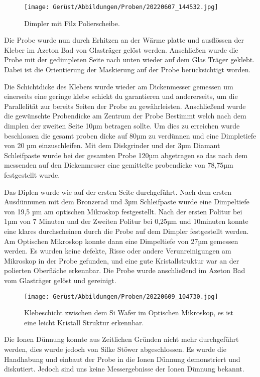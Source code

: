 \begin{figure}[htbp]
 \centering
 \texttt{[image: Gerüst/Abbildungen/Proben/20220607\_144532.jpg]}
 \caption[Dimpler]{Dimpler mit Filz Polierscheibe.}
 \label{Dimpler}
\end{figure}

Die Probe wurde nun durch Erhitzen an der Wärme platte und ausflössen der Kleber im Azeton Bad von Glasträger gelöst werden. Anschließen wurde die Probe mit der gedimpleten Seite nach unten wieder auf dem Glas Träger geklebt. Dabei ist die Orientierung der Maskierung auf der Probe berücksichtigt worden.

Die Schichtdicke des Klebers wurde wieder am Dickenmesser gemessen um einerseits eine geringe klebe schickt du garantieren und andererseits, um die Parallelität zur bereits Seiten der Probe zu gewährleisten.
Anschließend wurde die gewünschte Probendicke am Zentrum der Probe Bestimmt welch nach dem dimplen der zweiten Seite 10µm betragen sollte. Um dies zu erreichen wurde beschlossen die gesamt proben dicke auf 80µm zu verdünnen und eine Dimpletiefe von 20 µm einzuschleifen.
Mit dem Diskgrinder und der 3µm Diamant Schleifpaste wurde bei der gesamten Probe 120µm abgetragen so das nach dem messenden auf den Dickenmesser eine gemittelte probendicke von 78,75µm festgestellt wurde. 

Das Diplen wurde wie auf der ersten Seite durchgeführt. Nach dem ersten Ausdünnunen mit dem Bronzerad und 3µm Schleifpaste wurde eine Dimpeltiefe von 19,5 µm am optischen Mikroskop festgestellt. Nach der ersten Politur bei 1µm von 7 Minuten und der Zweiten Politur bei 0,25µm und 10minuten konnte eine klares durchscheinen durch die Probe auf dem Dimpler festgestellt werden.
Am Optischen Mikroskop konnte dann eine Dimpeltiefe von 27µm gemessen werden. Es wurden keine defekte, Risse oder andere Verunreinigungen am Mikroskop in der Probe gefunden, und eine gute Kristallstruktur war an der polierten Oberfläche erkennbar.
Die Probe wurde anschließend im Azeton Bad vom Glasträger gelöst und gereinigt.

\begin{figure}[htbp]
 \centering
 \texttt{[image: Gerüst/Abbildungen/Proben/20220609\_104730.jpg]}
 \caption[OptMikro]{Klebeschicht zwischen dem Si Wafer im Optischen Mikroskop, es ist eine leicht Kristall Struktur erkennbar.}
 \label{OptMikro}
\end{figure}

Die Ionen Dünnung konnte aus Zeitlichen Gründen nicht mehr durchgeführt werden, dies wurde jedoch von Silke Stöwer abgeschlossen. Es wurde die Handhabung und einbaut der Probe in die Ionen Dünnung demonstriert und diskutiert. Jedoch sind uns keine Messergebnisse der Ionen Dünnung bekannt.
